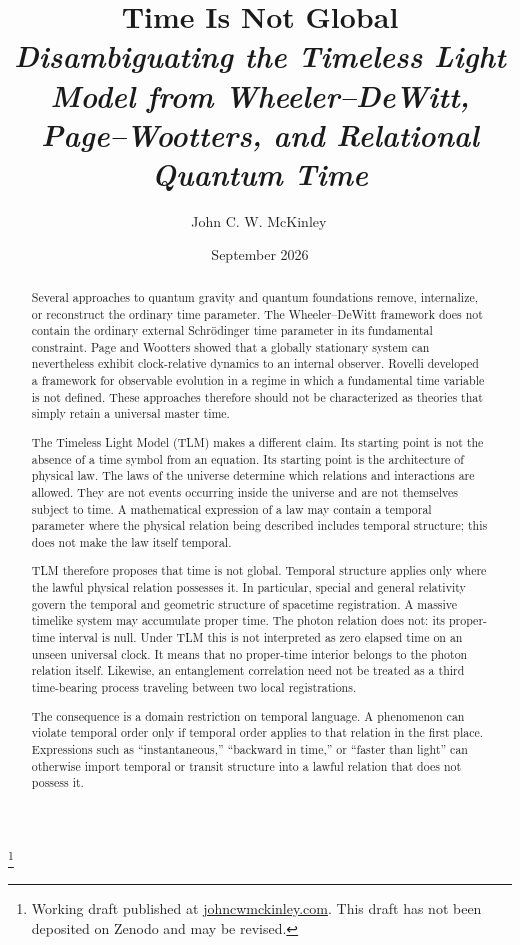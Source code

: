 \documentclass[12pt,onecolumn]{article}
\title{\textbf{Time Is Not Global}\\
\large\textit{Disambiguating the Timeless Light Model from
Wheeler--DeWitt, Page--Wootters, and Relational Quantum Time}}
\author{John C. W. McKinley\,\orcidlink{0009-0005-7097-5035}}
\date{September 2026}
\newcommand\blfootnote[1]{%
\begingroup
\renewcommand\thefootnote{}\footnote{#1}%
\addtocounter{footnote}{-1}%
\endgroup
}
\theoremstyle{plain}
\theoremstyle{definition}
\theoremstyle{remark}
\begin{document}
\maketitle

\blfootnote{\scriptsize Working draft published at \href{https://johncwmckinley.com}{johncwmckinley.com}. This draft has not been deposited on Zenodo and may be revised.}

\begin{abstract}

Several approaches to quantum gravity and quantum foundations remove,
internalize, or reconstruct the ordinary time parameter. The
Wheeler--DeWitt framework does not contain the ordinary external
Schr\"odinger time parameter in its fundamental constraint. Page and
Wootters showed that a globally stationary system can nevertheless exhibit
clock-relative dynamics to an internal observer. Rovelli developed a
framework for observable evolution in a regime in which a fundamental time
variable is not defined. These approaches therefore should not be
characterized as theories that simply retain a universal master time.

The Timeless Light Model (TLM) makes a different claim. Its starting point
is not the absence of a time symbol from an equation. Its starting point is
the architecture of physical law. The laws of the universe determine which
relations and interactions are allowed. They are not events occurring
inside the universe and are not themselves subject to time. A mathematical
expression of a law may contain a temporal parameter where the physical
relation being described includes temporal structure; this does not make
the law itself temporal.

TLM therefore proposes that time is not global. Temporal structure applies
only where the lawful physical relation possesses it. In particular,
special and general relativity govern the temporal and geometric structure
of spacetime registration. A massive timelike system may accumulate proper
time. The photon relation does not: its proper-time interval is null.
Under TLM this is not interpreted as zero elapsed time on an unseen
universal clock. It means that no proper-time interior belongs to the
photon relation itself. Likewise, an entanglement correlation need not be
treated as a third time-bearing process traveling between two local
registrations.

The consequence is a domain restriction on temporal language. A phenomenon
can violate temporal order only if temporal order applies to that relation
in the first place. Expressions such as ``instantaneous,'' ``backward in
time,'' or ``faster than light'' can otherwise import temporal or transit
structure into a lawful relation that does not possess it.


\end{abstract}
\end{document}
